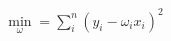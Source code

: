 \documentclass[preview]{standalone}
\begin{document}
\begin{align*}
\min_\omega = \sum_i^n (y_i-\omega_ix_i)^2
\end{align*}
\end{document}
